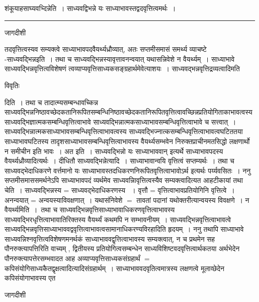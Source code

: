 \documentclass[10pt, openany]{book}
\begin{document}
{\newpage
\noindent
{\la शंकूयाह\textemdash साघ्यवभ्दिन्नेति~। साध्यवद्विभन्ने यः साध्याभावस्तद्वदवृत्तित्वमर्थः~।}\\
\hrule
\begin{center} जागदीशी \end{center}
{\la तदवृत्तित्वस्यव सम्यक्त्वे साध्याभावपदवैयर्थ्यध्रौव्यात्, अतः सप्तमीसमासं समर्थ्य व्याचष्टे -साध्यवद्भिन्नइति~। तथा च साध्यवद्भिन्नस्यावृत्तावनन्वयात् यथासन्निवेशे न वैयर्थ्यम्~। साध्याभावे साध्यवद्भिन्नवृत्तित्वविशेषणं त्वव्याप्यवृत्तिसाध्यकसङ्ग्रहार्थमेवेत्याशयः~। साध्यवद्भन्नवृत्तिद्रव्यत्वादिमति}
\begin{center}     विवृतिः \end{center}
दिति~। तथा च तादात्म्यसम्बन्धावच्किन्न साध्यवद्भिन्ननिष्ठावच्छेदकतानिरूपितसम्बन्धिनिष्ठावच्छेदकतानिरूपितवृत्तित्वावच्छिन्नप्रतियोगिताकाभावत्वस्य साध्यवद्भिज्ञात्मकसम्बन्धिवृत्तित्वाभावे साध्यवद्भिन्नात्मकसाध्याभावसम्बन्धिवृत्तित्वाभावे च सत्त्वात्~। साध्यवद्भिन्नात्मकसाध्याभावसम्बन्धिवृत्तित्वाभावत्वस्य
साध्यवद्भिज्नात्कसम्बन्धिवृत्तित्वाभावत्वघटिततया साध्याभावघटितस्य तादृशसाध्याभावसम्बन्धिवृत्तित्वाभावस्य वैयर्थ्यसम्भवेन निरुक्तप्राचीनमतसिद्धो लक्षणार्थो न समीचीन इति भावः~। अत इति~। साध्यवद्भिन्नो  यः साध्याभाववान् इत्यर्थे साध्याभावपदस्य वैयर्थ्यध्रौव्यादित्यर्थः~। दीधितौ साध्यवद्भिन्नेत्यादि~। साध्याभावान्वयि वृत्तित्वं सप्तम्यर्थः~। तथा च साध्यवद्भेदाधिकरणे वर्त्तमानो यः साध्याभावस्तदधिकरणनिरूपितवृत्तित्वाभावोऽर्थ इत्यर्थः पर्य्यवसितः~। ननु सप्तमीसमाससमर्थनेऽपि साध्याभावपदं व्यर्थमेव
साध्यवन्निावृत्तित्वस्यैव सम्यक्त्वादित्यत आह\textendash  टीकायां {\la तथा चेति~।} साध्यवद्भिन्नस्य = साध्यवद्भेदाधिकरणस्य  ~। वृत्तौ = वृत्तित्वाभावप्रतियोगिनि वृत्तित्वे~। अनन्वयात् = अन्वयस्याविवक्षणात्~। यथासंनिवेशे $=$ तावतां  पदानां यथोक्तरीत्यान्वयस्य विवक्षणे~। न {\la वैयर्थ्यमिति~।}~तथा च
साध्यवद्भिन्नवृत्तिसाध्याभावाधिकरणवृत्तित्वाभावस्य साध्यवद्भिरधृत्तित्वाभावातिरिक्तस्य वैयर्थ्यं  कथमपि न सम्भावनीयम्~। साध्यवद्भिन्नवृत्तित्वाभावत्वे
साध्यवद्भिन्नवृत्तिसाध्याभाववद्ववृत्तित्वाभावत्वसामानाधिकरण्यविरहादिति हृदयम्~। ननु तथापि साध्याभावे साध्यवन्निश्नवृत्तित्वविशेषणमनर्थकं साध्याभाववद्वृत्तित्वाभावस्य सम्यक्त्वात्, न च प्रथमेन सह पौनरुक्त्यापत्तिरिति वाच्यम् , द्वितीयस्य प्रतियोगित्वसम्बन्धेन साध्यविशिष्टवदवृत्तित्वार्थकतया अर्थभेदेन पौनरुक्त्यापत्तेरसम्भवादत आह अव्याप्यवृत्तिसाध्यकसंग्रहार्थं  $=$ कपिसंयोगिसाध्यकैतद्वृक्षत्वादित्यादिसंग्रहार्थम्~। साध्याभाववदवृतित्वमात्रस्य लक्षणत्वे मूलाव्छेदेन कपिसंयोगाभावस्य एत
\newpage
\begin{center} जागदीशी \end{center}
}
\end{document}
